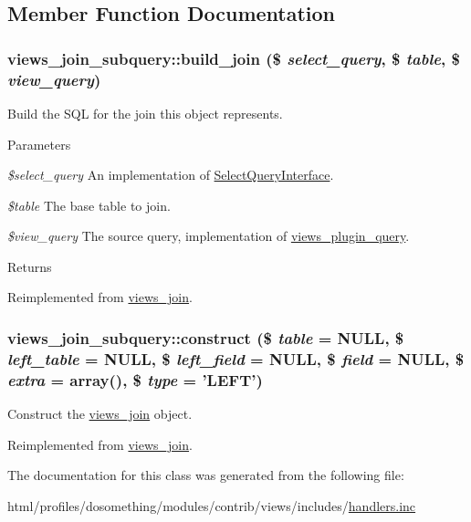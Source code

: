 \subsection{Member Function Documentation}
\hypertarget{classviews__join__subquery_aced6dd7573a138cd4f527b340fee501e}{
\subsubsection[{build\_\-join}]{\setlength{\rightskip}{0pt plus 5cm}views\_\-join\_\-subquery::build\_\-join (\$ {\em select\_\-query}, \/  \$ {\em table}, \/  \$ {\em view\_\-query})}}
\label{classviews__join__subquery_aced6dd7573a138cd4f527b340fee501e}
Build the SQL for the join this object represents.


\begin{DoxyParams}{Parameters}
\item[{\em \$select\_\-query}]An implementation of \hyperlink{interfaceSelectQueryInterface}{SelectQueryInterface}. \item[{\em \$table}]The base table to join. \item[{\em \$view\_\-query}]The source query, implementation of \hyperlink{classviews__plugin__query}{views\_\-plugin\_\-query}. \end{DoxyParams}
\begin{DoxyReturn}{Returns}

\end{DoxyReturn}


Reimplemented from \hyperlink{classviews__join_a1e7fae5813fcec89a848bc6326f152c5}{views\_\-join}.\hypertarget{classviews__join__subquery_a27a49742ee109b1329adcb86512837ab}{
\subsubsection[{construct}]{\setlength{\rightskip}{0pt plus 5cm}views\_\-join\_\-subquery::construct (\$ {\em table} = {\ttfamily NULL}, \/  \$ {\em left\_\-table} = {\ttfamily NULL}, \/  \$ {\em left\_\-field} = {\ttfamily NULL}, \/  \$ {\em field} = {\ttfamily NULL}, \/  \$ {\em extra} = {\ttfamily array()}, \/  \$ {\em type} = {\ttfamily 'LEFT'})}}
\label{classviews__join__subquery_a27a49742ee109b1329adcb86512837ab}
Construct the \hyperlink{classviews__join}{views\_\-join} object. 

Reimplemented from \hyperlink{classviews__join_ac6c6e70389e0c59e4b068903ef4950b9}{views\_\-join}.

The documentation for this class was generated from the following file:\begin{DoxyCompactItemize}
\item 
html/profiles/dosomething/modules/contrib/views/includes/\hyperlink{handlers_8inc}{handlers.inc}\end{DoxyCompactItemize}
